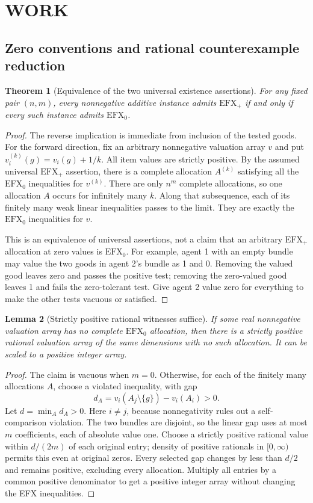 \documentclass[11pt,a4paper]{article}
\newtheorem{theorem}{Theorem}[section]
\newtheorem{lemma}[theorem]{Lemma}
\theoremstyle{definition}
\theoremstyle{remark}
\begin{document}
\section{WORK}
\subsection{Zero conventions and rational counterexample reduction}
\begin{theorem}[Equivalence of the two universal existence assertions]
For any fixed pair $(n,m)$, every nonnegative additive instance admits $\mathrm{EFX}_+$ if and only if every such instance admits $\mathrm{EFX}_0$.
\end{theorem}
\begin{proof}
The reverse implication is immediate from inclusion of the tested goods. For the forward direction, fix an arbitrary nonnegative valuation array $v$ and put $v_i^{(k)}(g)=v_i(g)+1/k$. All item values are strictly positive. By the assumed universal $\mathrm{EFX}_+$ assertion, there is a complete allocation $A^{(k)}$ satisfying all the $\mathrm{EFX}_0$ inequalities for $v^{(k)}$. There are only $n^m$ complete allocations, so one allocation $A$ occurs for infinitely many $k$. Along that subsequence, each of its finitely many weak linear inequalities passes to the limit. They are exactly the $\mathrm{EFX}_0$ inequalities for $v$.

This is an equivalence of universal assertions, not a claim that an arbitrary $\mathrm{EFX}_+$ allocation at zero values is $\mathrm{EFX}_0$. For example, agent 1 with an empty bundle may value the two goods in agent 2's bundle as 1 and 0. Removing the valued good leaves zero and passes the positive test; removing the zero-valued good leaves 1 and fails the zero-tolerant test. Give agent 2 value zero for everything to make the other tests vacuous or satisfied.
\end{proof}

\begin{lemma}[Strictly positive rational witnesses suffice]
If some real nonnegative valuation array has no complete $\mathrm{EFX}_0$ allocation, then there is a strictly positive rational valuation array of the same dimensions with no such allocation. It can be scaled to a positive integer array.
\end{lemma}
\begin{proof}
The claim is vacuous when $m=0$. Otherwise, for each of the finitely many allocations $A$, choose a violated inequality, with gap
\[
 d_A=v_i(A_j\setminus\{g\})-v_i(A_i)>0.
\]
Let $d=\min_A d_A>0$. Here $i\ne j$, because nonnegativity rules out a self-comparison violation. The two bundles are disjoint, so the linear gap uses at most $m$ coefficients, each of absolute value one. Choose a strictly positive rational value within $d/(2m)$ of each original entry; density of positive rationals in $[0,\infty)$ permits this even at original zeros. Every selected gap changes by less than $d/2$ and remains positive, excluding every allocation. Multiply all entries by a common positive denominator to get a positive integer array without changing the EFX inequalities.
\end{proof}
\end{document}
